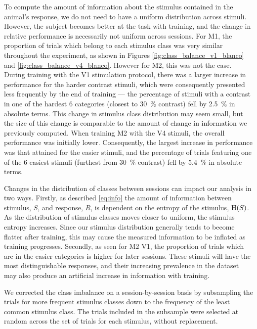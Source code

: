 To compute the amount of information about the stimulus contained in the animal's response, we do not need to have a uniform distribution across stimuli.
However, the subject becomes better at the task with training, and the change in relative performance is necessarily not uniform across sessions.
For \ac{M1}, the proportion of trials which belong to each stimulus class was very similar throughout the experiment, as shown in Figures \ref{fig:class_balance_v1_blanco} and \ref{fig:class_balance_v4_blanco}.
However for \ac{M2}, this was not the case.
During training with the \ac{V1} stimulation protocol, there was a larger increase in performance for the harder contrast stimuli, which were consequently presented less frequently by the end of training --- the percentage of stimuli with a contrast in one of the hardest 6 categories (closest to \SI{30}{\percent} contrast) fell by \SI{2.5}{\percent} in absolute terms.
This change in stimulus class distribution may seem small, but the size of this change is comparable to the amount of change in information we previously computed.
When training \ac{M2} with the \ac{V4} stimuli, the overall performance was initially lower.
Consequently, the largest increase in performance was that attained for the easier stimuli, and the percentage of trials featuring one of the 6 easiest stimuli (furthest from \SI{30}{\percent} contrast) fell by \SI{5.4}{\percent} in absolute terms.

Changes in the distribution of classes between sessions can impact our analysis in two ways.
Firstly, as described \autoref{eq:info} the amount of information between stimulus, $S$, and response, $R$, is dependent on the entropy of the stimulus, $\operatorname{H}(S)$.
As the distribution of stimulus classes moves closer to uniform, the stimulus entropy increases.
Since our stimulus distribution generally tends to become flatter after training, this may cause the measured information to be inflated as training progresses.
Secondly, as seen for \ac{M2} \ac{V1}, the proportion of trials which are in the easier categories is higher for later sessions.
These stimuli will have the most distinguishable responses, and their increasing prevalence in the dataset may also produce an artificial increase in information with training.

We corrected the class imbalance on a session-by-session basis by subsampling the trials for more frequent stimulus classes down to the frequency of the least common stimulus class.
The trials included in the subsample were selected at random across the set of trials for each stimulus, without replacement.


